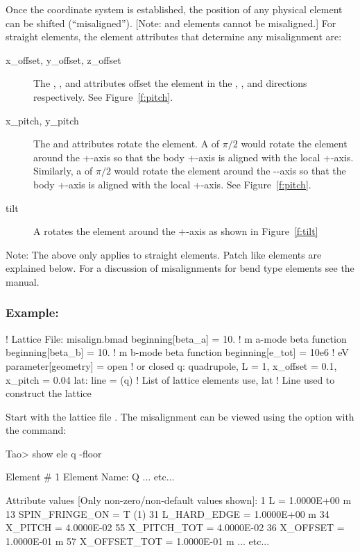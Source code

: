 \documentclass{hitec}     %
\begin{document}
{{{{Once the  coordinate system is established, the position of any physical element
can be shifted (``misaligned''). [Note:  and  elements cannot be misaligned.]
For straight elements, the element attributes that determine any misalignment are:
\begin{description}
\item[x_offset, y_offset, z_offset] \Newline
The , , and  attributes offset the element in the , ,
and  directions respectively. See Figure~\ref{f:pitch}.
%
\item[x_pitch, y_pitch] \Newline
The  and  attributes rotate the element. A  of $\pi/2$ would rotate the
element around the +-axis so that the body +-axis is aligned with the local
+-axis. Similarly, a  of $\pi/2$ would rotate the element around the --axis so
that the body +-axis is aligned with the local +-axis. See Figure~\ref{f:pitch}.
%
\item[tilt] \Newline
A  rotates the element around the +-axis as shown in Figure~\ref{f:tilt}
\end{description}

Note: The above only applies to straight elements. Patch like elements are explained below. For a
discussion of misalignments for bend type elements see the \bmad manual.

\subsubsection{Example:}
\begin{code}
! Lattice File: misalign.bmad
beginning[beta_a] = 10.   ! m  a-mode beta function
beginning[beta_b] = 10.   ! m  b-mode beta function
beginning[e_tot] = 10e6   ! eV
parameter[geometry] = open  ! or closed
q: quadrupole, L = 1, x_offset = 0.1, x_pitch = 0.04
lat: line = (q)   ! List of lattice elements
use, lat          ! Line used to construct the lattice
\end{code}

Start \tao with the lattice file . The
misalignment can be viewed using the  option with the  command:
\begin{code} 
Tao> show ele q -floor

 Element #                1
 Element Name: Q
... etc...

 Attribute values [Only non-zero/non-default values shown]:
    1  L               =  1.0000E+00 m
   13  SPIN_FRINGE_ON  =  T (1)
   31  L_HARD_EDGE     =  1.0000E+00 m
   34  X_PITCH         =  4.0000E-02       55  X_PITCH_TOT   =  4.0000E-02
   36  X_OFFSET        =  1.0000E-01 m     57  X_OFFSET_TOT  =  1.0000E-01 m
... etc...


\end{code}}}}}
\end{document}
